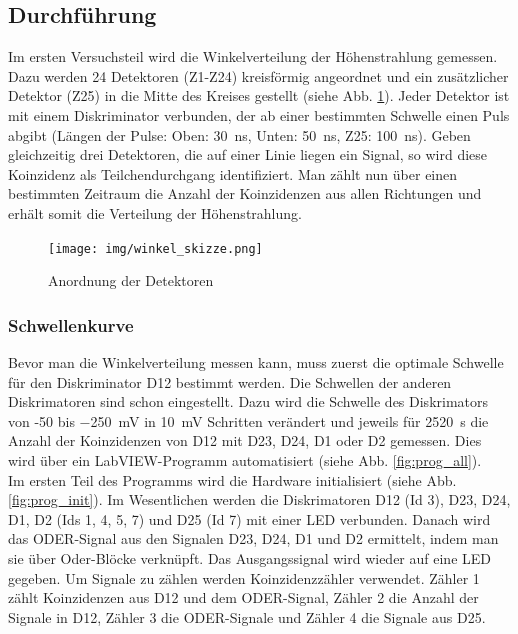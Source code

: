 \subsection{Durchführung}

Im ersten Versuchsteil wird die Winkelverteilung der Höhenstrahlung gemessen. Dazu werden 24 Detektoren (Z1-Z24) kreisförmig angeordnet und ein zusätzlicher Detektor (Z25) in die Mitte des Kreises gestellt (siehe Abb. \ref{fig:winkel_skizze}). Jeder Detektor ist mit einem Diskriminator verbunden, der ab einer bestimmten Schwelle einen Puls abgibt (Längen der Pulse: Oben: \SI{30}{\nano\second}, Unten: \SI{50}{\nano\second}, Z25: \SI{100}{\nano\second}).
Geben gleichzeitig drei Detektoren, die auf einer Linie liegen ein Signal, so wird diese Koinzidenz als Teilchendurchgang identifiziert. Man zählt nun über einen bestimmten Zeitraum die Anzahl der Koinzidenzen aus allen Richtungen und erhält somit die Verteilung der Höhenstrahlung.

\begin{figure}[h]
\centering
\texttt{[image: img/winkel\_skizze.png]}
\caption{Anordnung der Detektoren\cite{praktikumsheft}}
\label{fig:winkel_skizze}
\end{figure}

\subsubsection{Schwellenkurve}
Bevor man die Winkelverteilung messen kann, muss zuerst die optimale Schwelle für den Diskriminator D12 bestimmt werden. Die Schwellen der anderen Diskrimatoren sind schon eingestellt. Dazu wird die Schwelle des Diskrimators von -50 bis  \SI{-250}{\milli\volt} in \SI{10}{\milli\volt} Schritten verändert und jeweils für \SI{2520}{\second} die Anzahl der Koinzidenzen von D12 mit D23, D24, D1 oder D2 gemessen. Dies wird über ein LabVIEW-Programm automatisiert (siehe Abb. \ref{fig:prog_all}).\\

Im ersten Teil des Programms wird die Hardware initialisiert (siehe Abb. \ref{fig:prog_init}). Im Wesentlichen werden die Diskrimatoren D12 (Id 3), D23, D24, D1, D2 (Ids 1, 4, 5, 7) und D25 (Id 7) mit einer LED verbunden. Danach wird das ODER-Signal aus den Signalen D23, D24, D1 und D2 ermittelt, indem man sie über Oder-Blöcke verknüpft. Das Ausgangssignal wird wieder auf eine LED gegeben. Um Signale zu zählen werden Koinzidenzzähler verwendet. Zähler 1 zählt Koinzidenzen aus D12 und dem ODER-Signal, Zähler 2 die Anzahl der Signale in D12, Zähler 3 die ODER-Signale und Zähler 4 die Signale aus D25. \\

